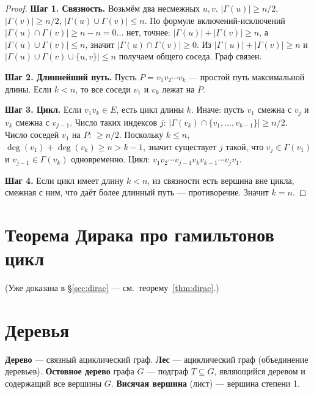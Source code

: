\documentclass[12pt]{article}
\begin{document}
\begin{proof}
\textbf{Шаг 1. Связность.} Возьмём два несмежных $u,v$.
$|\Gamma(u)| \geq n/2$, $|\Gamma(v)| \geq n/2$, $|\Gamma(u)\cup\Gamma(v)| \leq n$.
По формуле включений-исключений $|\Gamma(u)\cap\Gamma(v)| \geq n - n = 0$... 
нет, точнее: $|\Gamma(u)| + |\Gamma(v)| \geq n$, а $|\Gamma(u) \cup \Gamma(v)| \leq n$,
значит $|\Gamma(u) \cap \Gamma(v)| \geq 0$. Из $|\Gamma(u)| + |\Gamma(v)| \geq n$
и $|\Gamma(u) \cup \Gamma(v) \cup \{u,v\}| \leq n$ получаем общего соседа.
Граф связен.

\textbf{Шаг 2. Длиннейший путь.} Пусть $P = v_1 v_2 \cdots v_k$ ---
простой путь максимальной длины. Если $k < n$, то все соседи
$v_1$ и $v_k$ лежат на $P$.

\textbf{Шаг 3. Цикл.} Если $v_1 v_k \in E$, есть цикл длины $k$.
Иначе: пусть $v_1$ смежна с $v_j$ и $v_k$ смежна с $v_{j-1}$.
Число таких индексов $j$: $|\Gamma(v_k) \cap \{v_1,\ldots,v_{k-1}\}| \geq n/2$.
Число соседей $v_1$ на $P$: $\geq n/2$. Поскольку $k \leq n$,
$\deg(v_1) + \deg(v_k) \geq n > k-1$, значит существует $j$ такой,
что $v_j \in \Gamma(v_1)$ и $v_{j-1} \in \Gamma(v_k)$ одновременно.
Цикл: $v_1 v_2 \cdots v_{j-1} v_k v_{k-1} \cdots v_j v_1$.

\textbf{Шаг 4.} Если цикл имеет длину $k < n$, из связности
есть вершина вне цикла, смежная с ним, что даёт более длинный путь ---
противоречие. Значит $k = n$.
\end{proof}

\section{Теорема Дирака про гамильтонов цикл}

(Уже доказана в \S\ref{sec:dirac} --- см.~теорему~\ref{thm:dirac}.)

\section{Деревья}

\begin{definition}
\textbf{Дерево} --- связный ациклический граф.
\textbf{Лес} --- ациклический граф (объединение деревьев).
\textbf{Остовное дерево} графа $G$ --- подграф $T \subseteq G$,
являющийся деревом и содержащий все вершины $G$.
\textbf{Висячая вершина} (лист) --- вершина степени 1.
\end{definition}
\end{document}
